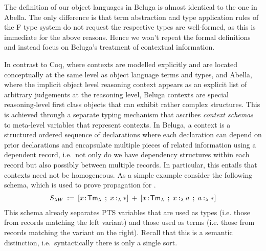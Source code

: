 The definition of our object languages in Beluga is almost identical to the one in Abella.
The only difference is that term abstraction and type application rules of the F type system do not request the respective types are well-formed, as this is immediate for the above reasons.
Hence we won't repeat the formal definitions and instead focus on Beluga's treatment of contextual information.

In contrast to Coq, where contexts are modelled explicitly and are located conceptually at the same level as object language terms and types, and Abella, where the implicit object level reasoning context appears as an explicit list of arbitrary judgements at the reasoning level, Beluga contexts are special reasoning-level first class objects that can exhibit rather complex structures.
%
This is achieved through a separate typing mechanism that ascribes \emph{context schemas} to meta-level variables that represent contexts.
In Beluga, a context is a structured ordered sequence of declarations where each declaration can depend on prior declarations and encapsulate multiple pieces of related information using a dependent record, i.e.~not only do we have dependency structures within each record but also possibly between multiple records.
In particular, this entails that contexts need not be homogeneous.
As a simple example consider the following schema, which is used to prove propagation for \SysL.
\begin{align*}
  S_{\lambda W} \eqdef [x\of\TmL \mrel{;} \typingLh{x}{\Prp}] \mrel{+} [x\of\TmL \mrel{;} \typingLh{x}{a} \mrel{;} \typingLh{a}{\Prp}]
\end{align*}
This schema already separates PTS variables that are used as types (i.e. those from records matching the left variant) and those used as terms (i.e. those from records matching the variant on the right).
Recall that this is a semantic distinction, i.e.~syntactically there is only a single sort.

